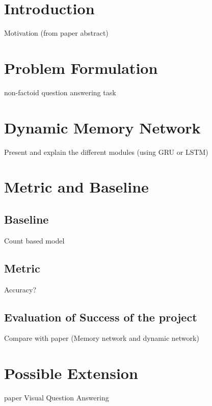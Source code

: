 \documentclass[submit]{harvardml}
\theoremstyle{plain}
\begin{document}
\section*{Introduction}

Motivation (from paper abstract)

\section{Problem Formulation}
non-factoid question answering task

\section{Dynamic Memory Network}

Present and explain the different modules (using GRU or LSTM)

\section{Metric and Baseline}
\subsection{Baseline}

Count based model

\subsection{Metric}
Accuracy?

\subsection{Evaluation of Success of the project}
Compare with paper (Memory network and dynamic network)

\section{Possible Extension}
paper Visual Question Answering
\end{document}
